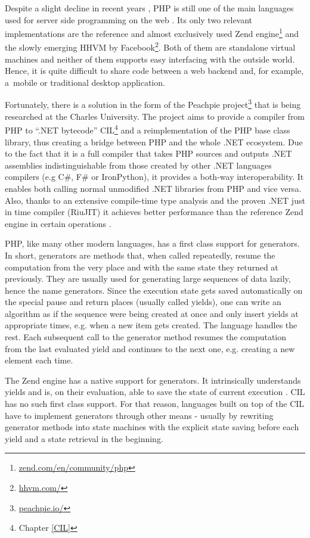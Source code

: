 
Despite a slight  decline in recent years \citep{Tiobe}, PHP is still one of the main languages used for server side programming on the web \citep{Stack}. Its only two relevant implementations are the reference and almost exclusively used Zend engine\footnote{\href{http://www.zend.com/en/community/php}{zend.com/en/community/php}} and the slowly emerging HHVM by Facebook\footnote{\href{http://hhvm.com/}{hhvm.com/}}. Both of them are standalone virtual machines and neither of them supports easy interfacing with the outside world. Hence, it is quite difficult to share code between a web backend and, for example, a~mobile or traditional desktop application.

Fortunately, there is a solution in the form of the Peachpie project\footnote{\href{http://www.peachpie.io/}{peachpie.io/}} that is being researched at the Charles University. The project aims to provide a compiler from PHP to “.NET bytecode” CIL\footnote{Chapter \ref{CIL}} and a reimplementation of the PHP base class library, thus creating a bridge between PHP and the whole .NET ecosystem. Due to the fact that it is a full compiler that takes PHP sources and outputs .NET assemblies indistinguishable from those created by other .NET languages compilers (e.g C\#, F\# or IronPython), it provides a both-way interoperability. It enables both calling normal unmodified .NET libraries from PHP and vice versa. Also, thanks to an extensive compile-time type analysis and the proven .NET just in time compiler (RiuJIT) it achieves better performance than the reference Zend engine in certain operations \citep{PchpBenchBlog, PchpBenchSite}.

PHP, like many other modern languages, has a first class support for generators. In short, generators are methods that, when called repeatedly, resume the computation from the very place and with the same state they returned at previously. They are usually used for generating large sequences of data lazily, hence the name generators. Since the execution state gets saved automatically on the special pause and return places (usually called yields), one can write an algorithm as if the sequence were being created at once and only insert yields at appropriate times, e.g. when a new item gets created. The language handles the rest. Each subsequent call to the generator method resumes the computation from the last evaluated yield and continues to the next one, e.g. creating a new element each time. 

The Zend engine has a native support for generators. It intrinsically understands yields and is, on their evaluation, able to save the state of current execution \citep{ZendGen}. CIL has no such first class support. For that reason, languages built on top of the CIL have to implement generators through other means \citep{CSharpGen} - usually by rewriting generator methods into state machines with the explicit state saving before each yield and a state retrieval in the beginning.

